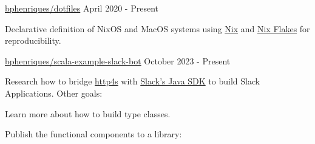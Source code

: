
\begin{cventries}
  \openSourceEntry
    {\href{https://github.com/bphenriques/dotfiles}{bphenriques/dotfiles}}
    {April 2020 - Present}
    {
    \begin{openSourceDescription}
    Declarative definition of NixOS and MacOS systems using \href{https://nixos.org/}{Nix} and \href{https://nixos.wiki/wiki/Flakes}{Nix Flakes} for reproducibility.
    \end{openSourceDescription}
    \vspace{4mm}
    }

  \vspace{2mm}

\openSourceEntry
    {\href{https://github.com/}{bphenriques/scala-example-slack-bot}}
    {October 2023 - Present}
    {   
    \begin{openSourceDescription}
    Research how to bridge \href{https://github.com/http4s/http4s}{http4s} with \href{https://github.com/slackapi/java-slack-sdk}{Slack's Java SDK} to build Slack Applications. Other goals:
    \end{openSourceDescription}
    \vspace{8mm}
    \begin{openSourceItems}
        \item Learn more about how to build type classes.
        \item Publish the functional components to a library:
    \end{openSourceItems}
    \vspace{4mm}
    }

  \vspace{2mm}  


\end{cventries}
